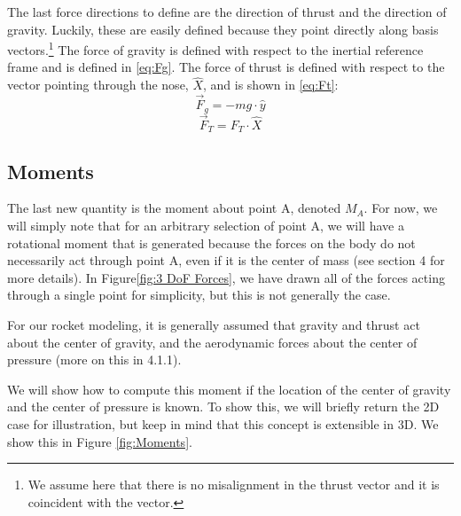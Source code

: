 \documentclass[12pt]{report}
\begin{document}
The last force directions to define are the direction of thrust and the direction of gravity. Luckily, these are easily defined because they point directly along basis vectors.\footnote{We assume here that there is no misalignment in the thrust vector and it is coincident with the  vector.} The force of gravity is defined with respect to the inertial reference frame and is defined in \eqref{eq:Fg}. The force of thrust is defined with respect to the vector pointing through the nose, $\hat{X}$, and is shown in \eqref{eq:Ft}:
\begin{equation}\label{eq:Fg}
    \vec{F}_g=-mg\cdot \hat{y}
\end{equation}
\begin{equation}\label{eq:Ft}
    \vec{F}_T=F_T\cdot \hat{X}
\end{equation}
\subsection{Moments}\label{sec:moments}
The last new quantity is the moment about point A, denoted $M_A$. For now, we will simply note that for an arbitrary selection of point A, we will have a rotational moment that is generated because the forces on the body do not necessarily act through point A, even if it is the center of mass (see section 4 for more details). In Figure\ref{fig:3 DoF Forces}, we have drawn all of the forces acting through a single point for simplicity, but this is not generally the case.

For our rocket modeling, it is generally assumed that gravity and thrust act about the center of gravity, and the aerodynamic forces about the center of pressure (more on this in 4.1.1).

We will show how to compute this moment if the location of the center of gravity and the center of pressure is known. To show this, we will briefly return the 2D case for illustration, but keep in mind that this concept is extensible in 3D. We show this in Figure \ref{fig:Moments}.
\end{document}

